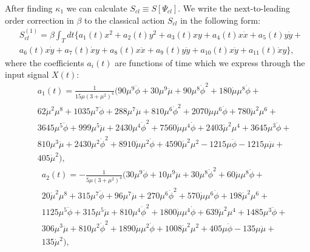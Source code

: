 \documentclass{article}
\begin{document}
After finding $\kappa_{1}$ we can calculate $S_{cl} \equiv S[\Psi_{cl}]$. We write the next-to-leading order correction in $\beta$ to the classical action $S_{cl}$ in the following form: 
\begin{eqnarray}
    &\!S_{cl}^{(1)} = \beta \int_{T} dt \Big\{a_{1}(t)x^{2} + a_{2}(t)y^{2} + a_{3}(t)xy + a_{4}(t)x\dot{x} + a_{5}(t)y\dot{y} +\nonumber\\
    &\!a_{6}(t)x\dot{y} + a_{7}(t)\dot{x}y + a_{8}(t)x\ddot{x} + a_{9}(t)y\ddot{y} + a_{10}(t)x\ddot{y} + a_{11}(t)\ddot{x}y\Big\},
\end{eqnarray}
where the coefficients $a_{i}(t)$ are functions of time which we express through the input signal $X(t)$:
\begin{eqnarray}\label{a1}
    &&a_{1}(t) = \frac{1}{15\mu(3+\mu^{2})^{4}} (90 \mu ^9 \ddot{\phi }+30 \mu ^9 \ddot{\mu }+90 \mu ^8 \dot{\phi }^2+180 \dot{\mu } \mu ^8 \dot{\phi }+ \nonumber\\
    &&62 \dot{\mu }^2 \mu ^8+1035 \mu ^7 \ddot{\phi } +288 \mu ^7 \ddot{\mu }+810 \mu ^6 \dot{\phi }^2+2070 \dot{\mu } \mu ^6 \dot{\phi }+780 \dot{\mu }^2 \mu ^6+\nonumber\\
    &&3645 \mu ^5 \ddot{\phi }+999 \mu ^5 \ddot{\mu }+2430 \mu ^4 \dot{\phi }^2+7560 \dot{\mu } \mu ^4 \dot{\phi }+2403 \dot{\mu }^2 \mu ^4+3645 \mu ^3 \ddot{\phi }+ \nonumber\\
    &&810 \mu ^3 \ddot{\mu } +2430 \mu ^2 \dot{\phi }^2+8910 \dot{\mu } \mu ^2 \dot{\phi }+4590 \dot{\mu }^2 \mu ^2-1215 \mu  \ddot{\phi }-1215 \mu  \ddot{\mu }+\nonumber\\
    &&405 \dot{\mu }^2),
\end{eqnarray}
\begin{eqnarray}\label{a2}
    &&a_{2}(t) = -\frac{1}{5\mu(3+\mu^{2})^{4}} (30 \mu ^9 \ddot{\phi }+10 \mu ^9 \ddot{\mu }+30 \mu ^8 \dot{\phi }^2+60 \dot{\mu } \mu ^8 \dot{\phi }+\nonumber\\
    &&20 \dot{\mu }^2 \mu ^8+315 \mu ^7 \ddot{\phi }+96 \mu ^7 \ddot{\mu }+270 \mu ^6 \dot{\phi }^2+570\dot{\mu } \mu ^6 \dot{\phi }+198 \dot{\mu }^2 \mu ^6+\nonumber\\
    &&1125 \mu ^5 \ddot{\phi }+315 \mu ^5 \ddot{\mu }+810 \mu ^4 \dot{\phi }^2+1800 \dot{\mu } \mu ^4 \dot{\phi }+639 \dot{\mu }^2 \mu ^4+1485 \mu ^3 \ddot{\phi }+\nonumber\\
    &&306 \mu ^3 \ddot{\mu }+810 \mu ^2 \dot{\phi }^2+1890 \dot{\mu } \mu ^2 \dot{\phi }+1008 \dot{\mu }^2 \mu ^2+405 \mu  \ddot{\phi }-135 \mu  \ddot{\mu }+\nonumber\\
    &&135 \dot{\mu }^2),
\end{eqnarray}
\end{document}
